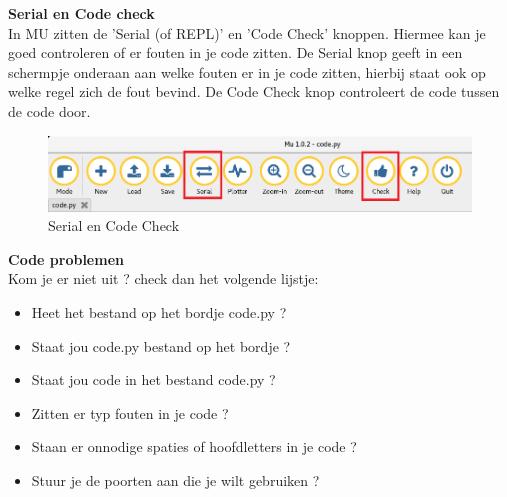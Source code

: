 \noindent \textbf{Serial en Code check} \\

In MU zitten de 'Serial (of REPL)' en 'Code Check' knoppen. Hiermee kan je goed  controleren of er fouten in je code zitten. De Serial knop geeft in een schermpje onderaan aan welke fouten er in je code zitten, hierbij staat ook op welke regel zich de fout bevind. De Code Check knop controleert de code tussen de code door. \\

\begin{figure}[h!]
    \centering
    \includegraphics{figures/check.png}
    \caption{Serial en Code Check}
    \label{fig:my_label}
\end{figure}

\noindent \textbf{Code problemen} \\

\noindent Kom je er niet uit ? check dan het volgende lijstje: \\

\begin{itemize}
    \item Heet het bestand op het bordje code.py ?
    \item Staat jou code.py bestand op het bordje ?
    \item Staat jou code in het bestand code.py ?
    \item Zitten er typ fouten in je code ?
    \item Staan er onnodige spaties of hoofdletters in je code ?
    \item Stuur je de poorten aan die je wilt gebruiken ?
\end{itemize}